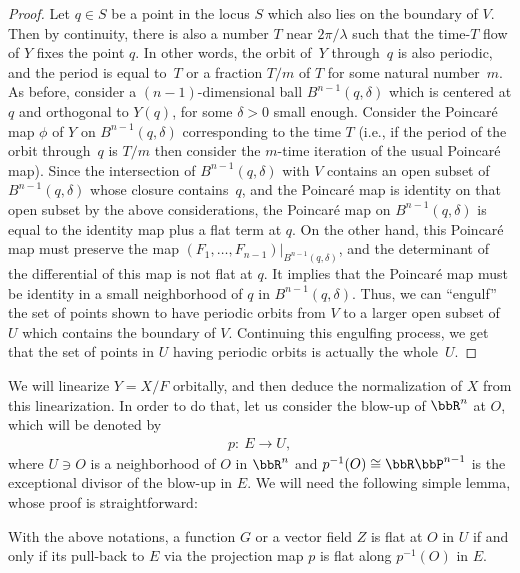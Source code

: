 \begin{proof}
Let $q \in S$ be a point in the locus $S$ which also lies on the boundary of $V$. Then by continuity, there is also
a number $T$ near $2\pi/\lambda$ such that the time-$T$ f\/low of $Y$ f\/ixes the point $q$. In other words, the orbit
of~$Y$ through~$q$ is also periodic, and the period is equal to~$T$ or a fraction $T/m$ of $T$ for some natural
number~$m$. As before, consider a $(n-1)$-dimensional
ball $B^{n-1}(q, \delta)$ which is centered at $q$ and orthogonal to $Y(q)$, for some $\delta > 0$ small enough.
Consider the Poincar\'e map $\phi$ of $Y$ on $B^{n-1}(q, \delta)$ corresponding to the time $T$ (i.e., if the period of the
orbit through~$q$ is $T/m$ then consider the $m$-time iteration of the usual Poincar\'e map). Since the intersection of
${B^{n-1}(q, \delta)}$ with $V$ contains an open subset of $B^{n-1}(q, \delta)$ whose closure contains~$q$, and
the Poincar\'e map is identity on that open subset by the above considerations, the Poincar\'e map on $B^{n-1}(q, \delta)$
is equal to the identity map plus a f\/lat term at $q$. On the other hand, this Poincar\'e map must preserve the
map $(F_1,\dots,F_{n-1})|_{B^{n-1}(q, \delta)}$, and the determinant of the dif\/ferential of this map is not f\/lat at $q$.
It implies that the Poincar\'e map must be identity in a small neighborhood of $q$ in ${B^{n-1}(q, \delta)}$. Thus, we can ``engulf'' the set of points shown to have periodic orbits from $V$ to a larger open subset of $U$ which contains the boundary of $V$. Continuing this
engulf\/ing process, we get that the set of points in $U$ having periodic orbits is actually the whole~$U$.
\end{proof}

 We will linearize $Y = X/F$ orbitally, and then deduce the normalization of $X$ from this linearization. In order to do that,
let us consider the blow-up of $\bbR^n$ at $O$, which will be denoted by
\begin{gather*}
 p\colon \ E \to U,
\end{gather*}
where $U \ni O$ is a neighborhood of $O$ in $\bbR^n$ and $p^{-1}(O) \cong \bbR \bbP^{n-1}$ is the exceptional
divisor of the blow-up in $E$. We will need the following simple lemma, whose proof is straightforward:

\begin{lem} \label{lem:blowup}
With the above notations, a function $G$ or a vector field $Z$ is flat at $O$ in $U$ if and only if its pull-back to
$E$ via the projection map $p$ is flat along $p^{-1}(O)$ in $E$.
\end{lem}

